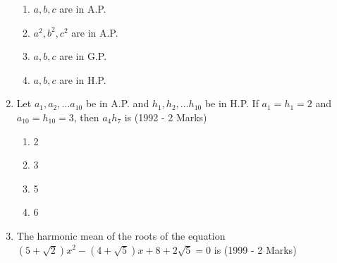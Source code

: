 \documentclass[journal]{IEEEtran}
\theoremstyle{remark}
\begin{document}
\begin{enumerate}
\begin{multicols}{2}
    \begin{enumerate}
        \item $a,b,c$ are in A.P.
        \item $a^2,b^2,c^2$ are in A.P.
        \item $a,b,c$ are in G.P.
        \item $a,b,c$ are in H.P.
    \end{enumerate}
    \end{multicols}
\item Let ${a_1,a_2,\dots a_{10}}$ be in A.P. and ${h_1,h_2, \dots h_{10}}$ be in H.P. If ${a_1}={h_1}=2$ and ${a_{10}}={h_{10}}=3$, then ${a_4h_7}$ is \hfill(1992 - 2 Marks)
    \begin{multicols}{4}
    \begin{enumerate}
        \item 2
        \item 3
        \item 5
        \item 6
        \end{enumerate}
        \end{multicols}
\item The harmonic mean of the roots of the equation
        $(5+\sqrt{2})x^2-(4+\sqrt{5})x+8+2\sqrt{5}=0$ is 
        \hfill(1999 - 2 Marks)
        \begin{multicols}{4}
            

\end{multicols}
\end{enumerate}
\end{document}
